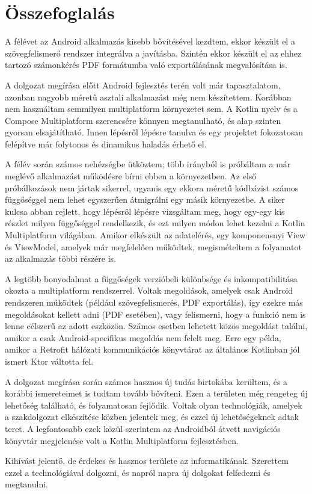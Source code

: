 \chapter{Összefoglalás}
\label{sec:Summary}

A félévet az Android alkalmazás kisebb bővítésével kezdtem, ekkor készült el a szövegfelismerő rendszer integrálva a javításba.
Szintén ekkor készült el az ehhez tartozó számonkérés PDF formátumba való exportálásának megvalósítása is.

A dolgozat megírása előtt Android fejlesztés terén volt már tapasztalatom, azonban nagyobb méretű asztali alkalmazást még nem készítettem.
Korábban nem használtam semmilyen multiplatform környezetet sem.
A Kotlin nyelv és a Compose Multiplatform szerencsére könnyen megtanulható, és alap szinten gyorsan elsajátítható. Innen lépésről lépésre tanulva és egy projektet fokozatosan felépítve már folytonos és dinamikus haladás érhető el.

A félév során számos nehézségbe ütköztem; több irányból is próbáltam a már meglévő alkalmazást működésre bírni ebben a környezetben.
Az első próbálkozások nem jártak sikerrel, ugyanis egy ekkora méretű kódbázist számos függőséggel nem lehet egyszerűen átmigrálni egy másik környezetbe.
A siker kulcsa abban rejlett, hogy lépésről lépésre vizsgáltam meg, hogy egy-egy kis részlet milyen függőséggel rendelkezik, és ezt milyen módon lehet kezelni a Kotlin Multiplatform világában.
Amikor elkészült az adatelérés, egy komponensnyi View és ViewModel, amelyek már megfelelően működtek, megismételtem a folyamatot az alkalmazás többi részére is.

A legtöbb bonyodalmat a függőségek verzióbeli különbsége és inkompatibilitása okozta a multiplatform rendszerrel.
Voltak megoldások, amelyek csak Android rendszeren működtek (például szövegfelismerés, PDF exportálás), így ezekre más megoldásokat kellett adni (PDF esetében), vagy felismerni, hogy a funkció nem is lenne célszerű az adott eszközön.
Számos esetben lehetett közös megoldást találni, amikor a csak Android-specifikus megoldás nem felelt meg.
Erre egy példa, amikor a Retrofit hálózati kommunikációs könyvtárat az általános Kotlinban jól ismert Ktor váltotta fel.

A dolgozat megírása során számos hasznos új tudás birtokába kerültem, és a korábbi ismereteimet is tudtam tovább bővíteni.
Ezen a területen még rengeteg új lehetőség található, és folyamatosan fejlődik.
Voltak olyan technológiák, amelyek a szakdolgozat elkészítése közben jelentek meg, és ezzel új lehetőségeknek adtak teret.
A legfontosabb ezek közül szerintem az Androidból átvett navigációs könyvtár megjelenése volt a Kotlin Multiplatform fejlesztésben.

Kihívást jelentő, de érdekes és hasznos területe az informatikának.
Szerettem ezzel a technológiával dolgozni, és napról napra új dolgokat felfedezni és megtanulni.
